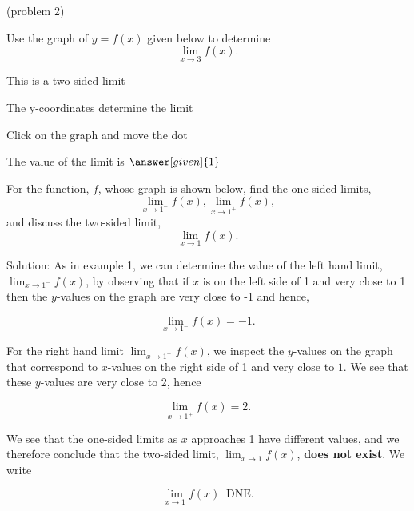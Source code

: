 \documentclass{ximera}
\begin{document}
\begin{problem}(problem 2)




Use the graph of $y = f(x)$ given below to determine
  \[
  \lim_{x\to 3} f(x).
  \]
  
    \begin{hint}
      This is a two-sided limit
    \end{hint}
    \begin{hint}
      The y-coordinates determine the limit
    \end{hint}
		\begin{hint}
		  Click on the graph and move the dot
		\end{hint}
		The value of the limit is
		 $\answer[given]{1}$

	
\end{problem}

\begin{example}[example 3]
For the function, $f$, whose graph is shown below, find the one-sided limits,
\[\lim_{x \to 1^-}f(x), \lim_{x \to 1^+}f(x),
\] 
and discuss the two-sided limit, 
\[\lim_{x \to 1} f(x).
\]





\vspace{.25in}
Solution: As in example 1, we can determine the value of the left hand limit, $\lim_{x \to 1^-}f(x)$, 
by observing that if $x$ is on the left side of 1 and very close to 1 then the $y$-values on the 
graph are very close to -1 and hence, 

\[
\lim_{x \to 1^-}f(x) = -1.
\]

For the right hand limit $\lim_{x \to 1^+}f(x)$, we inspect the $y$-values on the 
graph that correspond to $x$-values on the right side of 1 and very close to $1$.  
We see that these $y$-values are very close to 2, hence

\[
\lim_{x \to 1^+}f(x) = 2.
\]

We see that the one-sided limits as $x$ approaches 1 have different values, and we therefore 
conclude that the two-sided limit, $\lim_{x \to 1}f(x)$, \textbf{does not exist}.  We write

\[
\lim_{x \to 1}f(x) \;\;\text{DNE}.
\]

\end{example}
\end{document}
